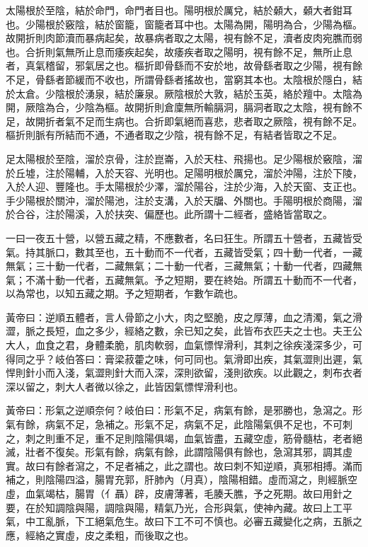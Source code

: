 太陽根於至陰，結於命門，命門者目也。陽明根於厲兌，結於顙大，顙大者鉗耳也。少陽根於竅陰，結於窗籠，窗籠者耳中也。太陽為開，陽明為合，少陽為樞。故開折則肉節瀆而暴病起矣，故暴病者取之太陽，視有餘不足，瀆者皮肉宛膲而弱也。合折則氣無所止息而痿疾起矣，故痿疾者取之陽明，視有餘不足，無所止息者，真氣稽留，邪氣居之也。樞折即骨繇而不安於地，故骨繇者取之少陽，視有餘不足，骨繇者節緩而不收也，所謂骨繇者搖故也，當窮其本也。太陰根於隱白，結於太倉。少陰根於湧泉，結於廉泉。厥陰根於大敦，結於玉英，絡於羶中。太陰為開，厥陰為合，少陰為樞。故開折則倉廩無所輸膈洞，膈洞者取之太陰，視有餘不足，故開折者氣不足而生病也。合折即氣絕而喜悲，悲者取之厥陰，視有餘不足。樞折則脈有所結而不通，不通者取之少陰，視有餘不足，有結者皆取之不足。

足太陽根於至陰，溜於京骨，注於崑崙，入於天柱、飛揚也。足少陽根於竅陰，溜於丘墟，注於陽輔，入於天容、光明也。足陽明根於厲兌，溜於沖陽，注於下陵，入於人迎、豐隆也。手太陽根於少澤，溜於陽谷，注於少海，入於天窗、支正也。手少陽根於關沖，溜於陽池，注於支溝，入於天牖、外關也。手陽明根於商陽，溜於合谷，注於陽溪，入於扶突、偏歷也。此所謂十二經者，盛絡皆當取之。

一曰一夜五十營，以營五藏之精，不應數者，名曰狂生。所謂五十營者，五藏皆受氣。持其脈口，數其至也，五十動而不一代者，五藏皆受氣；四十動一代者，一藏無氣；三十動一代者，二藏無氣；二十動一代者，三藏無氣；十動一代者，四藏無氣；不滿十動一代者，五藏無氣。予之短期，要在終始。所謂五十動而不一代者，以為常也，以知五藏之期。予之短期者，乍數乍疏也。

黃帝曰：逆順五體者，言人骨節之小大，肉之堅脆，皮之厚薄，血之清濁，氣之滑澀，脈之長短，血之多少，經絡之數，余已知之矣，此皆布衣匹夫之士也。夫王公大人，血食之君，身體柔脆，肌肉軟弱，血氣慓悍滑利，其刺之徐疾淺深多少，可得同之乎？岐伯答曰：膏梁菽藿之味，何可同也。氣滑即出疾，其氣澀則出遲，氣悍則針小而入淺，氣澀則針大而入深，深則欲留，淺則欲疾。以此觀之，刺布衣者深以留之，刺大人者微以徐之，此皆因氣慓悍滑利也。

黃帝曰：形氣之逆順奈何？岐伯曰：形氣不足，病氣有餘，是邪勝也，急瀉之。形氣有餘，病氣不足，急補之。形氣不足，病氣不足，此陰陽氣俱不足也，不可刺之，刺之則重不足，重不足則陰陽俱竭，血氣皆盡，五藏空虛，筋骨髓枯，老者絕滅，壯者不復矣。形氣有餘，病氣有餘，此謂陰陽俱有餘也，急瀉其邪，調其虛實。故曰有餘者瀉之，不足者補之，此之謂也。故曰刺不知逆順，真邪相搏。滿而補之，則陰陽四溢，腸胃充郭，肝肺內（月真），陰陽相錯。虛而瀉之，則經脈空虛，血氣竭枯，腸胃（亻聶）辟，皮膚薄著，毛腠夭膲，予之死期。故曰用針之要，在於知調陰與陽，調陰與陽，精氣乃光，合形與氣，使神內藏。故曰上工平氣，中工亂脈，下工絕氣危生。故曰下工不可不慎也。必審五藏變化之病，五脈之應，經絡之實虛，皮之柔粗，而後取之也。

